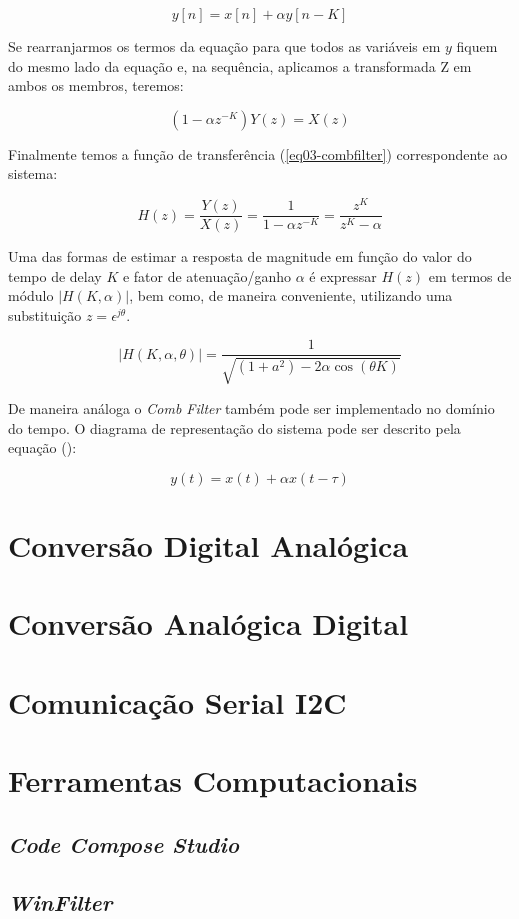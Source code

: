 		\begin{equation}
			\label{eq01-combfilter}
			y[n] = x[n] + \alpha y[n-K]
		\end{equation}
		
		Se rearranjarmos os termos da equação para que todos as variáveis em $y$ fiquem do mesmo lado da equação e, na sequência, aplicamos a transformada Z em ambos os membros, teremos:
		
		\begin{equation}
			\label{eq02-combfilter}
			(1-\alpha z^{-K})Y(z) = X(z)
		\end{equation}
		
		Finalmente temos a função de transferência (\ref{eq03-combfilter}) correspondente ao sistema:
		
		\begin{equation}
			\label{eq03-combfilter}
			H(z) = \frac{Y(z)}{X(z)} = \frac{1}{1-\alpha z^{-K}} = \frac{z^K}{z^K-\alpha}
		\end{equation}
		
		Uma das formas de estimar a resposta de magnitude em função do valor do tempo de delay $K$ e fator de atenuação/ganho $\alpha$ é expressar $ H(z) $ em termos de módulo $|H(K,\alpha)|$, bem como, de maneira conveniente, utilizando uma substituição $ z = \epsilon^{j\theta} $.
		
		\begin{equation}
			|H(K,\alpha,\theta)| = \frac{1}{\sqrt{(1+a^2) - 2\alpha \cos(\theta K)}}
		\end{equation}
		
		
		
		
		De maneira análoga o \textit{Comb Filter} também pode ser implementado no domínio do tempo. O diagrama de representação do sistema pode ser descrito pela equação ():
		
		\begin{equation}
			y(t) = x(t) + \alpha x(t-\tau)
			\label{eq05-combfilter}
		\end{equation}
		
		
		
\section{Conversão Digital Analógica}

\section{Conversão Analógica Digital}

\section{Comunicação Serial I2C}
	
\section{Ferramentas Computacionais}

	\subsection{\textit{Code Compose Studio}}
	
	\subsection{\textit{WinFilter}}
